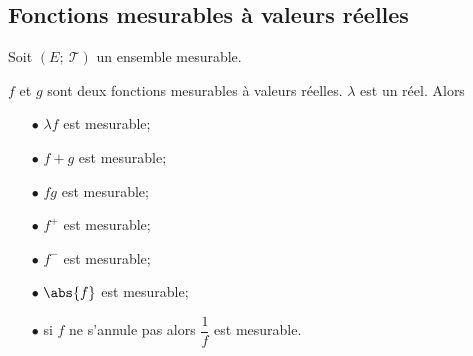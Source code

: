 \subsection{Fonctions mesurables à valeurs réelles}

\begin{prop}
Soit $(E;~\mathcal{T})$ un ensemble mesurable.

$f$ et $g$ sont deux fonctions mesurables à valeurs réelles. $\lambda$ est un réel. Alors
\begin{itemize}
\item[$\bullet$] $\lambda f$ est mesurable;
\item[$\bullet$] $f+g$ est mesurable;
\item[$\bullet$] $f g$ est mesurable;
\item[$\bullet$] $f^{+}$ est mesurable;
\item[$\bullet$] $f^{-}$ est mesurable;
\item[$\bullet$] $\abs{f}$ est mesurable;
\item[$\bullet$] si $f$ ne s'annule pas alors $\dfrac{1}{f}$ est mesurable.
\end{itemize}
\end{prop}

